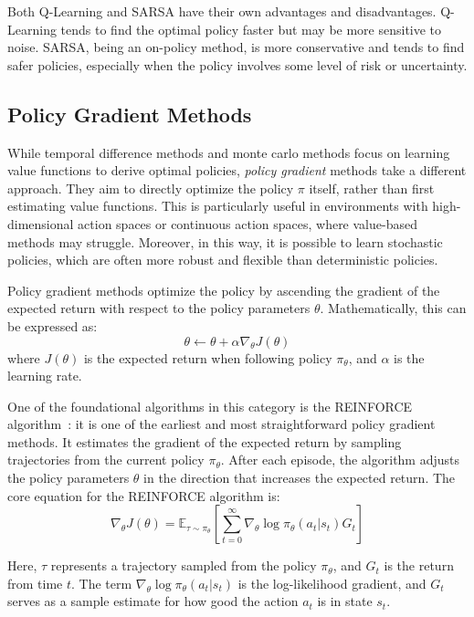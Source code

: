  Both Q-Learning and SARSA have their own advantages and disadvantages. 
  Q-Learning tends to find the optimal policy faster but may be more sensitive to noise. SARSA, being an on-policy method, is more conservative and tends to find safer policies, especially when the policy involves some level of risk or uncertainty.

\subsection{Policy Gradient Methods}

While temporal difference methods and monte carlo methods focus on learning value functions to derive optimal policies, \emph{policy gradient} methods take a different approach. 
  They aim to directly optimize the policy \(\pi\) itself, 
  rather than first estimating value functions. 
  This is particularly useful in environments with high-dimensional action spaces or continuous action spaces, where value-based methods may struggle.
  Moreover, in this way, it is possible to learn stochastic policies,
    which are often more robust and flexible than deterministic policies.

Policy gradient methods optimize the policy by ascending the gradient of the expected return with respect to the policy parameters \(\theta\). 
Mathematically, this can be expressed as:
\begin{equation}
\theta \leftarrow \theta + \alpha \nabla_\theta J(\theta)
\end{equation}
where \(J(\theta)\) is the expected return when following policy \(\pi_\theta\), and \(\alpha\) is the learning rate.

One of the foundational algorithms in this category is the REINFORCE algorithm~\cite{DBLP:conf/nips/SuttonMSM99}: 
 it is one of the earliest and most straightforward policy gradient methods. 
It estimates the gradient of the expected return by sampling trajectories from the current policy \(\pi_\theta\). 
After each episode, the algorithm adjusts the policy parameters \(\theta\) in the direction that increases the expected return.
%
The core equation for the REINFORCE algorithm is:
\begin{equation}
\nabla_\theta J(\theta) = \mathbb{E}_{\tau \sim \pi_\theta} \left[ \sum_{t=0}^{\infty} \nabla_\theta \log \pi_\theta(a_t | s_t) G_t \right]
\end{equation}

Here, \(\tau\) represents a trajectory sampled from the policy \(\pi_\theta\), and \(G_t\) is the return from time \(t\). 
 The term \(\nabla_\theta \log \pi_\theta(a_t | s_t)\) is the log-likelihood gradient, 
 and \(G_t\) serves as a sample estimate for how good the action \(a_t\) is in state \(s_t\).

